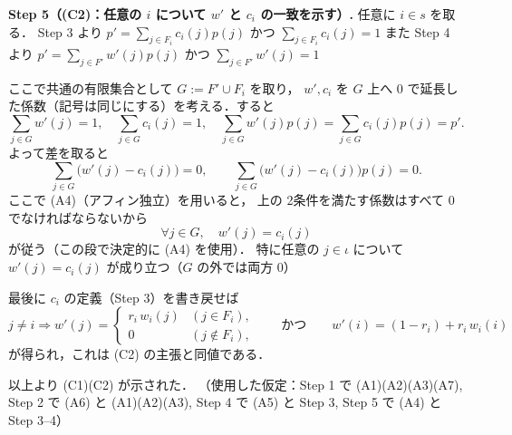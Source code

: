 \documentclass[a4paper,12pt]{bxjsbook}
\makeatletter
\newlength{\customindent}
\theoremstyle{theorem}
\renewenvironment{proof}[1][\proofname]{%
  \par\pushQED{\qed}%
  \normalfont
  \topsep6\p@\@plus6\p@\relax
  \list{}{%
    \leftmargin=\customindent
    \rightmargin=0pt
    \labelwidth=0pt
    \labelsep=0pt
    \itemindent=0pt
    \listparindent=0pt
    \parsep=0pt
  }%
  \item[\itshape #1\@addpunct{.}\hspace{0.5em}]%
  \setlength{\displayindent}{\customindent}%
  \setlength{\displaywidth}{\dimexpr\linewidth-\customindent\relax}%
  \ignorespaces
}{%
  \popQED\endlist\@endpefalse
}
\makeatother
\begin{document}
\begin{proof}
        \medskip
        \noindent\textbf{Step 5（(C2)：任意の $i$ について $w'$ と $c_i$ の一致を示す）.}
        任意に $i\in s$ を取る．
        Step 3 より $p'=\sum_{j\in F_i}c_i(j)p(j)$ かつ $\sum_{j\in F_i}c_i(j)=1$
        また Step 4 より $p'=\sum_{j\in F'}w'(j)p(j)$ かつ $\sum_{j\in F'}w'(j)=1$
        
        ここで共通の有限集合として $G:=F'\cup F_i$ を取り，
        $w',c_i$ を $G$ 上へ 0 で延長した係数（記号は同じにする）を考える．すると
        \[
          \sum_{j\in G}w'(j)=1,\quad \sum_{j\in G}c_i(j)=1,\quad
          \sum_{j\in G}w'(j)p(j)=\sum_{j\in G}c_i(j)p(j)=p'.
        \]
        よって差を取ると
        \[
          \sum_{j\in G}\bigl(w'(j)-c_i(j)\bigr)=0,\qquad
          \sum_{j\in G}\bigl(w'(j)-c_i(j)\bigr)p(j)=0.
        \]
        ここで (A4)（アフィン独立）を用いると，
        上の 2条件を満たす係数はすべて 0 でなければならないから
        \[
          \forall j\in G,\quad w'(j)=c_i(j)
        \]
        が従う（この段で決定的に (A4) を使用）．
        特に任意の $j\in\iota$ について $w'(j)=c_i(j)$ が成り立つ（$G$ の外では両方 0）
        
        最後に $c_i$ の定義（Step 3）を書き戻せば
        \[
          j\neq i \Rightarrow
          w'(j)=
          \begin{cases}
            r_i\,w_i(j) & (j\in F_i),\\
            0 & (j\notin F_i),
          \end{cases}
          \qquad\text{かつ}\qquad
          w'(i)=(1-r_i)+r_i\,w_i(i)
        \]
        が得られ，これは (C2) の主張と同値である．
        
        \medskip
        以上より (C1)(C2) が示された．
        （使用した仮定：Step 1 で (A1)(A2)(A3)(A7),
        Step 2 で (A6) と (A1)(A2)(A3),
        Step 4 で (A5) と Step 3,
        Step 5 で (A4) と Step 3--4）
    \end{proof}
\end{document}
